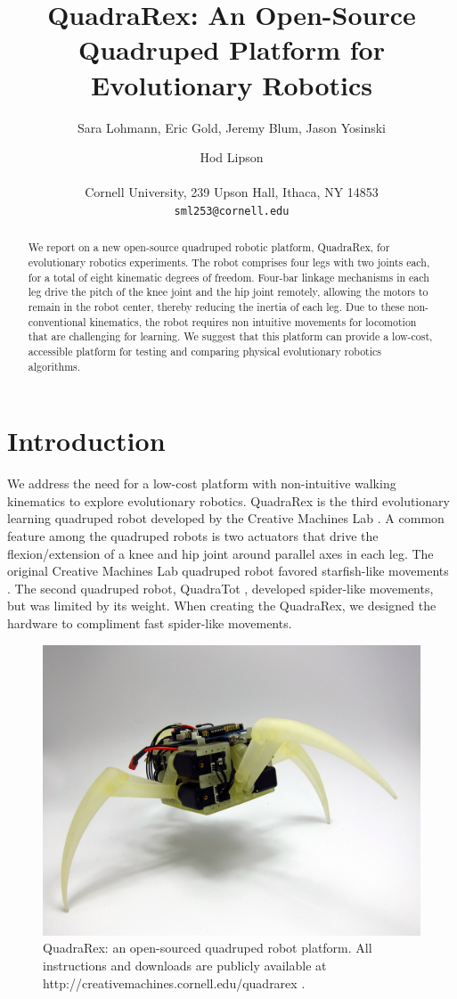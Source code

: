 \documentclass[letterpaper]{article}
\title{QuadraRex: An Open-Source Quadruped Platform for Evolutionary Robotics}
\author{Sara Lohmann, Eric Gold, Jeremy Blum, Jason Yosinski \and Hod Lipson \\
\mbox{}\\
Cornell University, 239 Upson Hall, Ithaca, NY 14853 \\
\texttt{sml253@cornell.edu}}
\begin{document}
\maketitle

\begin{abstract}
We report on a new open-source quadruped robotic platform, QuadraRex,
for evolutionary robotics experiments. The robot comprises four legs
with two joints each, for a total of eight kinematic degrees of
freedom. Four-bar linkage mechanisms in each leg drive the pitch of
the knee joint and the hip joint remotely, allowing the motors to
remain in the robot center, thereby reducing the inertia of each
leg. Due to these non-conventional kinematics, the robot requires non
intuitive movements for locomotion that are challenging for
learning. We suggest that this platform can provide a low-cost,
accessible platform for testing and comparing physical evolutionary
robotics algorithms.
\end{abstract}



\section{Introduction}

We address the need for a low-cost platform with non-intuitive walking
kinematics to explore evolutionary robotics. QuadraRex is the third
evolutionary learning quadruped robot developed by the Creative
Machines Lab \citep{HL, JY}. A common feature among the quadruped
robots is two actuators that drive the flexion/extension of a knee and
hip joint around parallel axes in each leg. The original Creative
Machines Lab quadruped robot favored starfish-like movements
\citep{HL}. The second quadruped robot, QuadraTot \citep{JY},
developed spider-like movements, but was limited by its weight. When
creating the QuadraRex, we designed the hardware to compliment fast
spider-like movements.

\begin{figure}[t]
\begin{center}
\includegraphics[width=.45\textwidth]{fig1.jpg}
\caption{QuadraRex: an open-sourced quadruped robot platform. All
  instructions and downloads are publicly available at
  http://creativemachines.cornell.edu/quadrarex \citep{WEB}.}
\label{fig1}
\end{center}
\end{figure}
\end{document}
